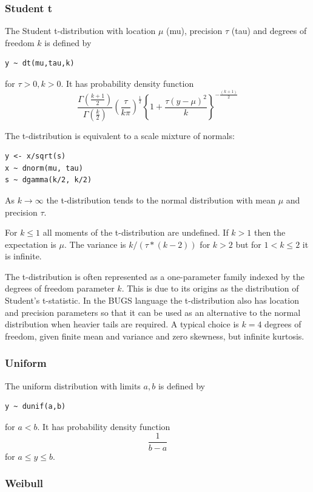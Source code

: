 \documentclass[11pt, a4paper, titlepage]{report}
\begin{document}
\subsubsection{Student t}
\label{bugs:dt}

The Student t-distribution with location $\mu$ (mu), precision $\tau$
(tau) and degrees of freedom $k$ is defined by
\begin{verbatim}
y ~ dt(mu,tau,k)
\end{verbatim}
for $\tau > 0, k > 0$. It has probability density function
\[
\frac{\Gamma(\frac{k+1}{2})}{\Gamma(\frac{k}{2})} 
\left(\frac{\tau}{k\pi} \right)^{\frac{1}{2}} 
\left\{1 + \frac{\tau (y - \mu)^2}{k} \right\}^{-\frac{(k+1)}{2}}
\]

The t-distribution is equivalent to a scale mixture of normals:
\begin{verbatim}
y <- x/sqrt(s)
x ~ dnorm(mu, tau)
s ~ dgamma(k/2, k/2)
\end{verbatim}
As $k \rightarrow \infty$ the t-distribution tends to the normal distribution
with mean $\mu$ and precision $\tau$.

For $k \leq 1$ all moments of the t-distribution are undefined. If $k
> 1$ then the expectation is $\mu$. The variance is $k/(\tau*(k-2))$
for $k > 2$ but for $1 < k \leq 2$ it is infinite.

The t-distribution is often represented as a one-parameter family
indexed by the degrees of freedom parameter $k$. This is due to its
origins as the distribution of Student's t-statistic. In the BUGS
language the t-distribution also has location and precision parameters
so that it can be used as an alternative to the normal distribution
when heavier tails are required.  A typical choice is $k=4$ degrees of
freedom, given finite mean and variance and zero skewness, but
infinite kurtosis.

\subsubsection{Uniform}
\label{bugs:dunif}

The uniform distribution with limits $a, b$ is defined by
\begin{verbatim}
y ~ dunif(a,b)
\end{verbatim}
for $a < b$. It has probability density function
\[
\frac{\textstyle 1}{\textstyle b - a}
\]
for $a \leq y \leq b$.

\subsubsection{Weibull}
\label{bugs:dweib}
\end{document}
